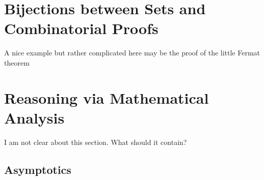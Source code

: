 \section{Bijections between Sets and Combinatorial Proofs}

{\Denis A nice example but rather complicated here may be the proof of the little Fermat theorem}


\section{Reasoning via Mathematical Analysis}
\label{sec:analysis}

{\Denis I am not clear about this section.
What should it contain?}

%
%
%


\subsection{Asymptotics}
\label{sec:asymptotics}

